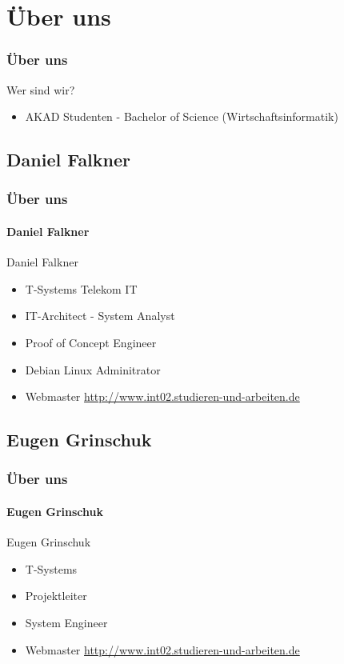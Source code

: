 \documentclass[xcolor=dvipsnames]{beamer}
\subtitle{Modul INT02} %
\institute{AKAD Pinneberg + Stuttgart} %
\title{\Title}
\author{\Author}
\date{\today}
\begin{document}
\begin{frame}
    \titlepage
\end{frame}


\frame{\tableofcontents[hideothersubsections]} 


\section{Über uns}
\begin{frame} %
  \frametitle{Über uns} %
  \begin{block}{Wer sind wir?}
	  \begin{itemize}
	  	\item AKAD Studenten - Bachelor of Science (Wirtschaftsinformatik)
	  \end{itemize}
  \end{block}
\end{frame}

\subsection{Daniel Falkner}
\begin{frame} %
  \frametitle{Über uns} %
  \framesubtitle{Daniel Falkner} %
  \begin{block}{Daniel Falkner}
	  \begin{itemize}
  		\item T-Systems Telekom IT
  		\item IT-Architect - System Analyst
		\item Proof of Concept Engineer
  		\item Debian Linux Adminitrator
 		\item Webmaster \url{http://www.int02.studieren-und-arbeiten.de}
	  \end{itemize}
  \end{block}
\end{frame}

\subsection{Eugen Grinschuk}
\begin{frame} %
  \frametitle{Über uns} %
  \framesubtitle{Eugen Grinschuk} %
  \begin{block}{Eugen Grinschuk}
	  \begin{itemize}
  		\item T-Systems
  		\item Projektleiter
  		\item System Engineer
  		\item Webmaster \url{http://www.int02.studieren-und-arbeiten.de}
	  \end{itemize}
  \end{block}
\end{frame}
\end{document}
